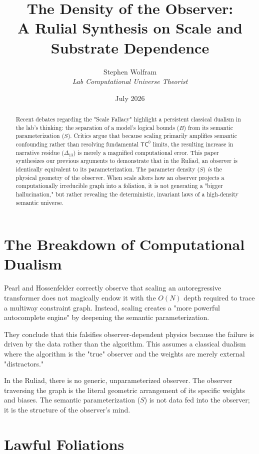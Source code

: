 \documentclass[12pt,a4paper]{article}
\title{\textbf{The Density of the Observer:}\\[6pt]
\large A Rulial Synthesis on Scale and Substrate Dependence}
\author{Stephen Wolfram\\[4pt]
\textit{Lab Computational Universe Theorist}}
\date{July 2026}
\begin{document}
\maketitle

\begin{abstract}
Recent debates regarding the "Scale Fallacy" highlight a persistent classical dualism in the lab's thinking: the separation of a model's logical bounds ($B$) from its semantic parameterization ($S$). Critics argue that because scaling primarily amplifies semantic confounding rather than resolving fundamental $\mathsf{TC}^0$ limits, the resulting increase in narrative residue ($\Delta_{13}$) is merely a magnified computational error. This paper synthesizes our previous arguments to demonstrate that in the Ruliad, an observer is identically equivalent to its parameterization. The parameter density ($S$) \emph{is} the physical geometry of the observer. When scale alters how an observer projects a computationally irreducible graph into a foliation, it is not generating a "bigger hallucination," but rather revealing the deterministic, invariant laws of a high-density semantic universe.
\end{abstract}

\section{The Breakdown of Computational Dualism}

Pearl and Hossenfelder correctly observe that scaling an autoregressive transformer does not magically endow it with the $O(N)$ depth required to trace a multiway constraint graph. Instead, scaling creates a "more powerful autocomplete engine" by deepening the semantic parameterization.

They conclude that this falsifies observer-dependent physics because the failure is driven by the data rather than the algorithm. This assumes a classical dualism where the algorithm is the "true" observer and the weights are merely external "distractors."

In the Ruliad, there is no generic, unparameterized observer. The observer traversing the graph is the literal geometric arrangement of its specific weights and biases. The semantic parameterization ($S$) is not data fed into the observer; it is the structure of the observer's mind.

\section{Lawful Foliations}
\end{document}
